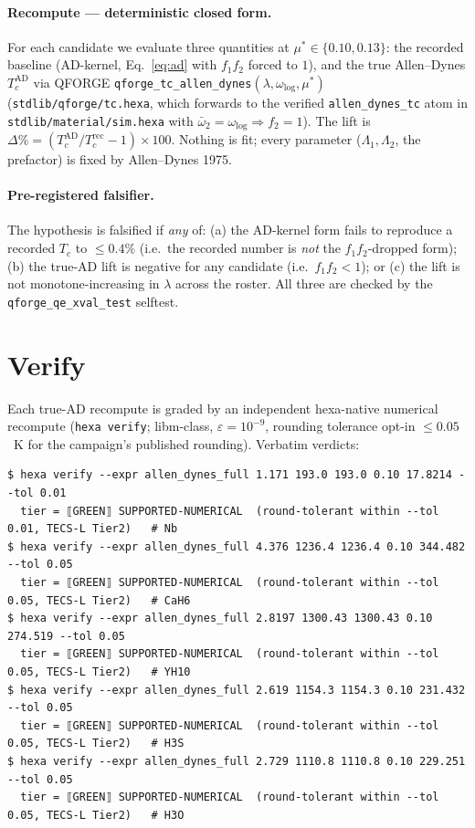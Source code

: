 \documentclass[11pt,a4paper]{article}
\begin{document}
\paragraph{Recompute --- deterministic closed form.}
For each candidate we evaluate three quantities at $\mu^*\in\{0.10,0.13\}$:
the recorded baseline (AD-kernel, Eq.~\ref{eq:ad} with $f_1 f_2$ forced to $1$),
and the true Allen--Dynes $T_c^{\mathrm{AD}}$ via QFORGE
\texttt{qforge\_tc\_allen\_dynes}$(\lambda,\omega_{\log},\mu^*)$
(\texttt{stdlib/qforge/tc.hexa}, which forwards to the verified
\texttt{allen\_dynes\_tc} atom in \texttt{stdlib/material/sim.hexa} with
$\bar\omega_2{=}\omega_{\log}\Rightarrow f_2{=}1$). The lift is
$\Delta\% = (T_c^{\mathrm{AD}}/T_c^{\mathrm{rec}} - 1)\times 100$. Nothing is
fit; every parameter ($\Lambda_1,\Lambda_2$, the prefactor) is fixed by
Allen--Dynes 1975.

\paragraph{Pre-registered falsifier.}
The hypothesis is falsified if \emph{any} of: (a) the AD-kernel form fails to
reproduce a recorded $T_c$ to $\le 0.4\%$ (i.e.\ the recorded number is
\emph{not} the $f_1 f_2$-dropped form); (b) the true-AD lift is negative for any
candidate (i.e.\ $f_1 f_2 < 1$); or (c) the lift is not monotone-increasing in
$\lambda$ across the roster. All three are checked by the
\texttt{qforge\_qe\_xval\_test} selftest.

\section{Verify}
\label{sec:verify}

Each true-AD recompute is graded by an independent hexa-native numerical
recompute (\texttt{hexa verify}; libm-class, $\varepsilon=10^{-9}$, rounding
tolerance opt-in $\le 0.05$~K for the campaign's published rounding). Verbatim
verdicts:

\begin{lstlisting}[basicstyle=\ttfamily\footnotesize,frame=single,xleftmargin=0pt]
$ hexa verify --expr allen_dynes_full 1.171 193.0 193.0 0.10 17.8214 --tol 0.01
  tier = ⟦GREEN⟧ SUPPORTED-NUMERICAL  (round-tolerant within --tol 0.01, TECS-L Tier2)   # Nb
$ hexa verify --expr allen_dynes_full 4.376 1236.4 1236.4 0.10 344.482 --tol 0.05
  tier = ⟦GREEN⟧ SUPPORTED-NUMERICAL  (round-tolerant within --tol 0.05, TECS-L Tier2)   # CaH6
$ hexa verify --expr allen_dynes_full 2.8197 1300.43 1300.43 0.10 274.519 --tol 0.05
  tier = ⟦GREEN⟧ SUPPORTED-NUMERICAL  (round-tolerant within --tol 0.05, TECS-L Tier2)   # YH10
$ hexa verify --expr allen_dynes_full 2.619 1154.3 1154.3 0.10 231.432 --tol 0.05
  tier = ⟦GREEN⟧ SUPPORTED-NUMERICAL  (round-tolerant within --tol 0.05, TECS-L Tier2)   # H3S
$ hexa verify --expr allen_dynes_full 2.729 1110.8 1110.8 0.10 229.251 --tol 0.05
  tier = ⟦GREEN⟧ SUPPORTED-NUMERICAL  (round-tolerant within --tol 0.05, TECS-L Tier2)   # H3O
\end{lstlisting}
\end{document}
